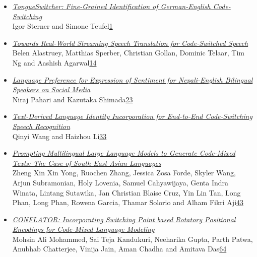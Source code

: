 \documentclass[11pt,oneside]{book}
\begin{document}
\begin{itemize}[leftmargin=*,label={}]
       \item \hyperlink{page.1}{\emph{TongueSwitcher: Fine-Grained Identification of German-English Code-Switching}}\\ \hspace*{2em} Igor Sterner and Simone Teufel\dotfill \hyperlink{page.1}{1}
       \item \hyperlink{page.14}{\emph{Towards Real-World Streaming Speech Translation for Code-Switched Speech}}\\ \hspace*{2em} Belen Alastruey, Matthias Sperber, Christian Gollan, Dominic Telaar, Tim Ng and Aashish Agarwal\dotfill \hyperlink{page.14}{14}
       \item \hyperlink{page.23}{\emph{Language Preference for Expression of Sentiment for Nepali-English Bilingual Speakers on Social Media}}\\ \hspace*{2em} Niraj Pahari and Kazutaka Shimada\dotfill \hyperlink{page.23}{23}
       \item \hyperlink{page.33}{\emph{Text-Derived Language Identity Incorporation for End-to-End Code-Switching Speech Recognition}}\\ \hspace*{2em} Qinyi Wang and Haizhou Li\dotfill \hyperlink{page.33}{33}
       \item \hyperlink{page.43}{\emph{Prompting Multilingual Large Language Models to Generate Code-Mixed Texts: The Case of South East Asian Languages}}\\ \hspace*{2em} Zheng Xin Xin Yong, Ruochen Zhang, Jessica Zosa Forde, Skyler Wang, Arjun Subramonian, Holy Lovenia, Samuel Cahyawijaya, Genta Indra Winata, Lintang Sutawika, Jan Christian Blaise Cruz, Yin Lin Tan, Long Phan, Long Phan, Rowena Garcia, Thamar Solorio and Alham Fikri Aji\dotfill \hyperlink{page.43}{43}
       \item \hyperlink{page.64}{\emph{CONFLATOR: Incorporating Switching Point based Rotatory Positional Encodings for Code-Mixed Language Modeling}}\\ \hspace*{2em} Mohsin Ali Mohammed, Sai Teja Kandukuri, Neeharika Gupta, Parth Patwa, Anubhab Chatterjee, Vinija Jain, Aman Chadha and Amitava Das\dotfill \hyperlink{page.64}{64}

\end{itemize}
\end{document}
